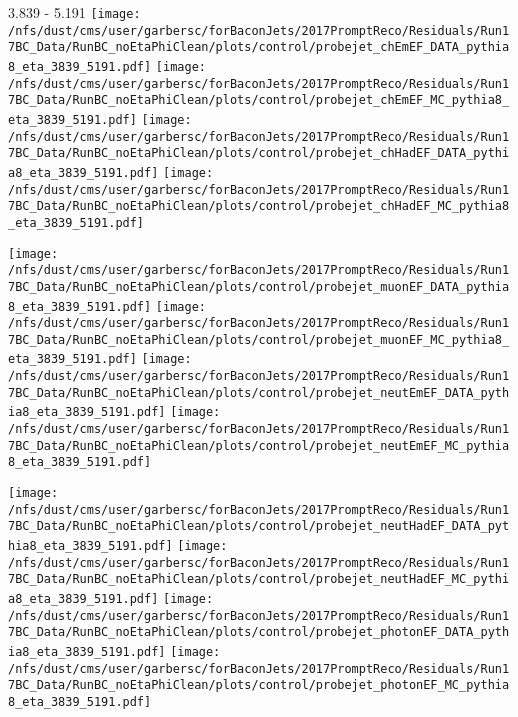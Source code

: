 \documentclass[t,compress]{beamer}
\begin{document}
\begin{frame}{3.839 - 5.191}
	\texttt{[image: /nfs/dust/cms/user/garbersc/forBaconJets/2017PromptReco/Residuals/Run17BC\_Data/RunBC\_noEtaPhiClean/plots/control/probejet\_chEmEF\_DATA\_pythia8\_eta\_3839\_5191.pdf]}
	\texttt{[image: /nfs/dust/cms/user/garbersc/forBaconJets/2017PromptReco/Residuals/Run17BC\_Data/RunBC\_noEtaPhiClean/plots/control/probejet\_chEmEF\_MC\_pythia8\_eta\_3839\_5191.pdf]}
	\texttt{[image: /nfs/dust/cms/user/garbersc/forBaconJets/2017PromptReco/Residuals/Run17BC\_Data/RunBC\_noEtaPhiClean/plots/control/probejet\_chHadEF\_DATA\_pythia8\_eta\_3839\_5191.pdf]}
	\texttt{[image: /nfs/dust/cms/user/garbersc/forBaconJets/2017PromptReco/Residuals/Run17BC\_Data/RunBC\_noEtaPhiClean/plots/control/probejet\_chHadEF\_MC\_pythia8\_eta\_3839\_5191.pdf]}
\newline

\vspace{-0.65cm}
	\texttt{[image: /nfs/dust/cms/user/garbersc/forBaconJets/2017PromptReco/Residuals/Run17BC\_Data/RunBC\_noEtaPhiClean/plots/control/probejet\_muonEF\_DATA\_pythia8\_eta\_3839\_5191.pdf]}
	\texttt{[image: /nfs/dust/cms/user/garbersc/forBaconJets/2017PromptReco/Residuals/Run17BC\_Data/RunBC\_noEtaPhiClean/plots/control/probejet\_muonEF\_MC\_pythia8\_eta\_3839\_5191.pdf]}
	\texttt{[image: /nfs/dust/cms/user/garbersc/forBaconJets/2017PromptReco/Residuals/Run17BC\_Data/RunBC\_noEtaPhiClean/plots/control/probejet\_neutEmEF\_DATA\_pythia8\_eta\_3839\_5191.pdf]}
	\texttt{[image: /nfs/dust/cms/user/garbersc/forBaconJets/2017PromptReco/Residuals/Run17BC\_Data/RunBC\_noEtaPhiClean/plots/control/probejet\_neutEmEF\_MC\_pythia8\_eta\_3839\_5191.pdf]}
\newline

\vspace{-0.65cm}
	\texttt{[image: /nfs/dust/cms/user/garbersc/forBaconJets/2017PromptReco/Residuals/Run17BC\_Data/RunBC\_noEtaPhiClean/plots/control/probejet\_neutHadEF\_DATA\_pythia8\_eta\_3839\_5191.pdf]}
	\texttt{[image: /nfs/dust/cms/user/garbersc/forBaconJets/2017PromptReco/Residuals/Run17BC\_Data/RunBC\_noEtaPhiClean/plots/control/probejet\_neutHadEF\_MC\_pythia8\_eta\_3839\_5191.pdf]}
	\texttt{[image: /nfs/dust/cms/user/garbersc/forBaconJets/2017PromptReco/Residuals/Run17BC\_Data/RunBC\_noEtaPhiClean/plots/control/probejet\_photonEF\_DATA\_pythia8\_eta\_3839\_5191.pdf]}
	\texttt{[image: /nfs/dust/cms/user/garbersc/forBaconJets/2017PromptReco/Residuals/Run17BC\_Data/RunBC\_noEtaPhiClean/plots/control/probejet\_photonEF\_MC\_pythia8\_eta\_3839\_5191.pdf]}
\end{frame}
\end{document}
